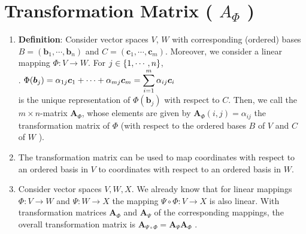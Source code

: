 \section{Transformation Matrix ( $A_\Phi$ )}

\begin{enumerate}
    \item \textbf{Definition}: Consider vector spaces $V$, $W$ with corresponding (ordered) bases $B = (\bm{b}_1, \cdots , \bm{b}_n)$ and $C = (\bm{c}_1, \cdots , \bm{c}_m)$. 
    Moreover, we consider a linear mapping $\Phi : V \to W$. 
    For $j \in \left\{1, \cdots , n\right\}$,
    \hfill \cite{mfml/book/mml/Deisenroth-Faisal-Ong}
    \\
    .\hfill
    $
        \Phi(\bm{b}_j ) = \alpha _{1j} \bm{c}_1 + \cdots + \alpha _{mj} \bm{c}_m 
        = \displaystyle\sum^m_{i=1} \alpha _{ij} \bm{c}_i
    $
    \hfill \cite{mfml/book/mml/Deisenroth-Faisal-Ong}
    \\
    is the unique representation of $\Phi(\bm{b}_j )$ with respect to $C$. 
    Then, we call the $m \times n$-matrix $\bm{A}_\Phi$, whose elements are given by $\bm{A}_\Phi(i, j) = \alpha_{ij}$ the transformation matrix of $\Phi$ (with respect to the ordered bases $B$ of $V$ and $C$ of $W$  ).
    \hfill \cite{mfml/book/mml/Deisenroth-Faisal-Ong}

    \item The transformation matrix can be used to map coordinates with respect to an ordered basis in $V$ to coordinates with respect to an ordered basis in $W$.
    \hfill \cite{mfml/book/mml/Deisenroth-Faisal-Ong}

    \item Consider vector spaces $V, W, X$. 
    We already know that for linear mappings $\Phi  : V \to  W$ and $\Psi : W \to  X$ the mapping $\Psi \circ \Phi  : V \to  X$ is also linear. 
    With transformation matrices $\bm{A}_\Phi$  and $\bm{A}_\Psi$ of the corresponding mappings, the overall transformation matrix is $\bm{A}_{\Psi\circ\Phi}  = \bm{A}_\Psi \bm{A}_\Phi$ .
    \hfill \cite{mfml/book/mml/Deisenroth-Faisal-Ong}


\end{enumerate}
